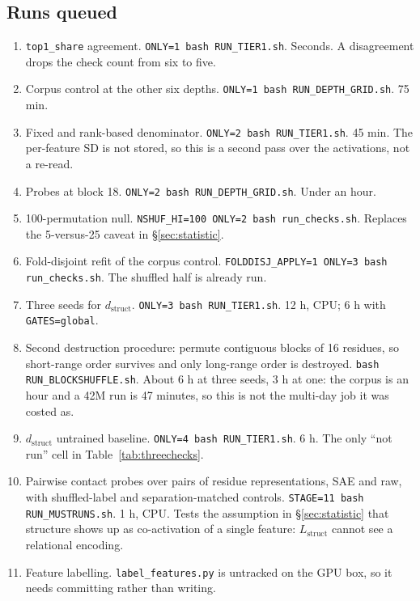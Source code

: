 \documentclass{article} %
\newcommand{\Lstruct}{\ensuremath{L_{\mathrm{struct}}}}
\newcommand{\dstruct}{\ensuremath{d_{\mathrm{struct}}}}
\begin{document}
\subsection{Runs queued}

\begin{enumerate}[label=T\arabic*., ref=T\arabic*, leftmargin=2.6em]

\item \label{t:top1share} \texttt{top1\_share} agreement. \texttt{ONLY=1 bash RUN\_TIER1.sh}.
Seconds. A disagreement drops the check count from six to five.

\item \label{t:depthgrid} Corpus control at the other six depths.
\texttt{ONLY=1 bash RUN\_DEPTH\_GRID.sh}. 75 min.

\item \label{t:denominator} Fixed and rank-based denominator.
\texttt{ONLY=2 bash RUN\_TIER1.sh}. 45 min. The per-feature SD is not stored, so this is a second
pass over the activations, not a re-read.

\item \label{t:probe18} Probes at block 18. \texttt{ONLY=2 bash RUN\_DEPTH\_GRID.sh}. Under an
hour.

\item \label{t:perm100} 100-permutation null. \texttt{NSHUF\_HI=100 ONLY=2 bash run\_checks.sh}.
Replaces the 5-versus-25 caveat in \S\ref{sec:statistic}.

\item \label{t:folddisjoint} Fold-disjoint refit of the corpus control.
\texttt{FOLDDISJ\_APPLY=1 ONLY=3 bash run\_checks.sh}. The shuffled half is already run.

\item \label{t:dstructseeds} Three seeds for \dstruct. \texttt{ONLY=3 bash RUN\_TIER1.sh}. 12 h,
CPU; 6 h with \texttt{GATES=global}.

\item \label{t:blockshuffle} Second destruction procedure: permute contiguous blocks of 16
residues, so short-range order survives and only long-range order is destroyed.
\texttt{bash RUN\_BLOCKSHUFFLE.sh}. About 6 h at three seeds, 3 h at one: the corpus is an hour
and a 42M run is 47 minutes, so this is not the multi-day job it was costed as.

\item \label{t:dstructuntrained} \dstruct{} untrained baseline.
\texttt{ONLY=4 bash RUN\_TIER1.sh}. 6 h. The only ``not run'' cell in
Table~\ref{tab:threechecks}.

\item \label{t:pairwise} Pairwise contact probes over pairs of residue representations, SAE and raw, with
shuffled-label and separation-matched controls. \texttt{STAGE=11 bash RUN\_MUSTRUNS.sh}. 1 h, CPU.
Tests the assumption in \S\ref{sec:statistic} that structure shows up as co-activation of a single
feature: \Lstruct{} cannot see a relational encoding.

\item Feature labelling. \texttt{label\_features.py} is untracked on the GPU box, so it needs
committing rather than writing.

\end{enumerate}
\end{document}
